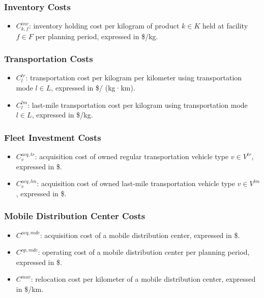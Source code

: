 \documentclass[12pt]{article}
\begin{document}
\subsubsection{Inventory Costs}
\begin{itemize}
    \item $C^{inv}_{k,f}$: inventory holding cost per kilogram of product $k \in K$ held at facility $f \in F$ per planning period, expressed in \$/kg.
\end{itemize}

\subsubsection{Transportation Costs}
\begin{itemize}
    \item $C^{tr}_{l}$: transportation cost per kilogram per kilometer using transportation mode $l \in L$, expressed in \$/ (kg·km).

    \item $C^{lm}_{l}$: last-mile transportation cost per kilogram using transportation mode $l \in L$, expressed in \$/kg.
\end{itemize}

\subsubsection{Fleet Investment Costs}
\begin{itemize}
    \item $C^{acq,tr}_{v}$: acquisition cost of owned regular transportation vehicle type $v \in V^{tr}$, expressed in \$.

    \item $C^{acq,lm}_{v}$: acquisition cost of owned last-mile transportation vehicle type $v \in V^{lm}$, expressed in \$.
\end{itemize}

\subsubsection{Mobile Distribution Center Costs}
\begin{itemize}
    \item $C^{acq,mdc}$: acquisition cost of a mobile distribution center, expressed in \$.

    \item $C^{op,mdc}$: operating cost of a mobile distribution center per planning period, expressed in \$.

    \item $C^{mov}$: relocation cost per kilometer of a mobile distribution center, expressed in \$/km.
\end{itemize}
\end{document}
